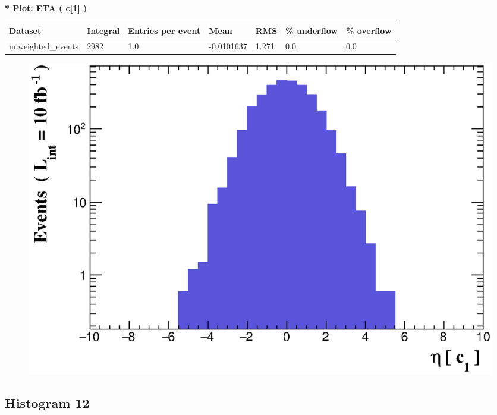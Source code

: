 \documentclass[a4paper, 10pt]{article}
\begin{document}
\textbf{* Plot: ETA ( c[1] ) }\\
   \begin{table}[H]
  \begin{center}
    \begin{tabular}{|m{23.0mm}|m{23.0mm}|m{18.0mm}|m{19.0mm}|m{19.0mm}|m{19.0mm}|m{19.0mm}|}
      \hline
      {\cellcolor{yellow}         Dataset}& {\cellcolor{yellow}         Integral}& {\cellcolor{yellow}         Entries per event}& {\cellcolor{yellow}         Mean}& {\cellcolor{yellow}         RMS}& {\cellcolor{yellow}         \% underflow}& {\cellcolor{yellow}         \% overflow}\\
      \hline
      {\cellcolor{white}         unweighted\_events}& {\cellcolor{white}         2982}& {\cellcolor{white}         1.0}& {\cellcolor{white}         -0.0101637}& {\cellcolor{white}         1.271}& {\cellcolor{green}         0.0}& {\cellcolor{green}         0.0}\\
\hline
    \end{tabular}
  \end{center}
\end{table}

\begin{figure}[H]
  \begin{center}
    \includegraphics[scale=0.45]{selection_10.eps}\\
\caption{   }
  \end{center}
\end{figure}
      \newpage
\subsection{ Histogram 12}
\end{document}
